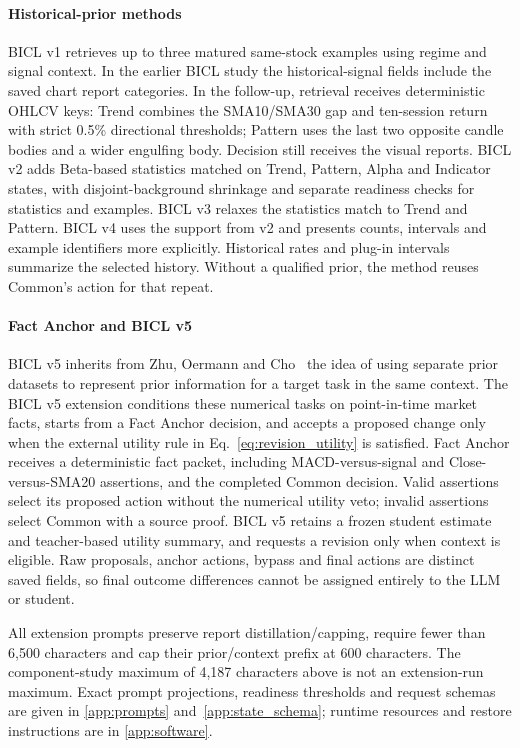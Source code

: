 \paragraph{Historical-prior methods}
BICL v1 retrieves up to three matured same-stock examples using regime
and signal context. In the earlier BICL study the historical-signal
fields include the saved chart report categories. In the follow-up,
retrieval receives deterministic OHLCV keys: Trend combines the
SMA10/SMA30 gap and ten-session return with strict 0.5\% directional
thresholds; Pattern uses the last two opposite candle bodies and a
wider engulfing body. Decision still receives the visual reports. BICL v2 adds Beta-based statistics matched on Trend, Pattern, Alpha and Indicator states, with disjoint-background shrinkage and separate readiness checks for statistics and examples. BICL v3 relaxes the statistics match to Trend and Pattern. BICL v4 uses the support from v2 and presents counts, intervals and example identifiers more explicitly. Historical rates and plug-in intervals summarize the selected history. Without a qualified prior, the method reuses Common's action for that repeat.

\paragraph{Fact Anchor and BICL v5}
BICL v5 inherits from Zhu, Oermann and Cho~\cite{zhu2026multitask} the idea of using separate prior datasets to represent prior information for a target task in the same context.
The BICL v5 extension conditions these numerical tasks on point-in-time market facts, starts from a Fact Anchor decision, and accepts a proposed change only when the external utility rule in Eq.~\ref{eq:revision_utility} is satisfied.
Fact Anchor receives a deterministic fact packet, including MACD-versus-signal and Close-versus-SMA20 assertions, and the completed Common decision. Valid assertions select its proposed action without the numerical utility veto; invalid assertions select Common with a source proof. BICL v5 retains a frozen student estimate and teacher-based utility summary, and requests a revision only when context is eligible. Raw proposals, anchor actions, bypass and final actions are distinct saved fields, so final outcome differences cannot be assigned entirely to the LLM or student.

All extension prompts preserve report distillation/capping, require fewer than 6,500 characters and cap their prior/context prefix at 600 characters. The component-study maximum of 4,187 characters above is not an extension-run maximum. Exact prompt projections, readiness thresholds and request schemas are given in \ref{app:prompts} and~\ref{app:state_schema}; runtime resources and restore instructions are in \ref{app:software}.
